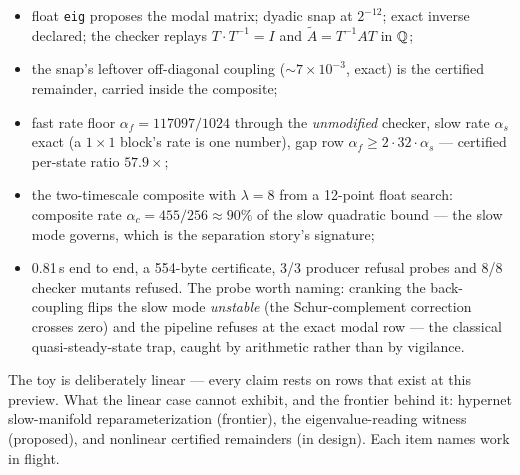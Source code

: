 \begin{itemize}
\item float \texttt{eig} proposes the modal matrix; dyadic snap at
  $2^{-12}$; exact inverse declared; the checker replays
  $T \cdot T^{-1} = I$ and $\tilde A = T^{-1} A T$ in $\mathbb{Q}$;
\item the snap's leftover off-diagonal coupling
  (${\sim}7 \times 10^{-3}$, exact) is the certified remainder,
  carried inside the composite;
\item fast rate floor $\alpha_f = 117097/1024$ through the
  \emph{unmodified} checker, slow rate $\alpha_s$ exact (a
  $1 \times 1$ block's rate is one number), gap row
  $\alpha_f \ge 2 \cdot 32 \cdot \alpha_s$ --- certified per-state
  ratio $57.9\times$;
\item the two-timescale composite with $\lambda = 8$ from a 12-point
  float search: composite rate $\alpha_c = 455/256 \approx 90\%$ of
  the slow quadratic bound --- the slow mode governs, which is the
  separation story's signature;
\item 0.81\,s end to end, a 554-byte certificate, 3/3 producer refusal
  probes and 8/8 checker mutants refused. The probe worth naming:
  cranking the back-coupling flips the slow mode \emph{unstable} (the
  Schur-complement correction crosses zero) and the pipeline refuses
  at the exact modal row --- the classical quasi-steady-state trap,
  caught by arithmetic rather than by vigilance.
\end{itemize}

The toy is deliberately linear --- every claim rests on rows that
exist at this preview. What the linear case cannot exhibit, and the
frontier behind it: hypernet slow-manifold reparameterization
(frontier), the eigenvalue-reading witness (proposed), and nonlinear
certified remainders (in design). Each item names work in flight.

